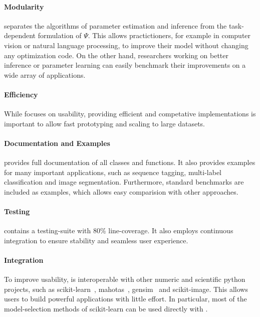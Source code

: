 \paragraph{Modularity} \pystruct separates the algorithms of parameter estimation and
     inference from the task-dependent formulation of $\Psi$. This allows
     practictioners, for example in computer vision or natural language
     processing, to improve their model without changing any optimization
     code. On the other hand, researchers working on better inference or
     parameter learning can easily benchmark their improvements on a wide
     array of applications.

\paragraph{Efficiency}
     While \pystruct focuses on usability, providing efficient and competative
     implementations is important to allow fast prototyping and scaling to
     large datasets.

\paragraph{Documentation and Examples}
     \pystruct provides full documentation of all classes and functions.  It
     also provides examples for many important applications, such as
     sequence tagging, multi-label classification and image segmentation.
     Furthermore, standard benchmarks are included as examples, which allows
     easy comparision with other approaches.

\paragraph{Testing}
     \pystruct contains a testing-suite with 80\% line-coverage. It also employs continuous integration
     to ensure stability and seamless user experience.

\paragraph{Integration}
     To improve usability, \pystruct is interoperable with other numeric and scientific python projects,
     such as {\sc scikit-learn}~\citep{pedregosa2011scikit},
     {\sc mahotas}~\citep{coelho:mahotas}, {\sc gensim}~\citep{rehurek_lrec} and {\sc scikit-image}.
     This allows users to build powerful applications with little effort. In
     particular, most of the model-selection methods of scikit-learn can be used
     directly with \pystruct.


